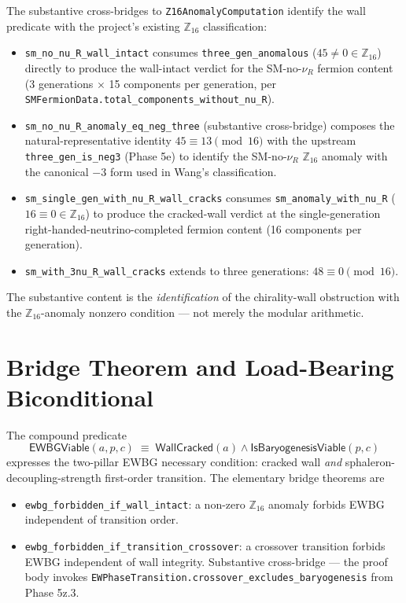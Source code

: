 \documentclass[aps,prl,twocolumn,showpacs,superscriptaddress,nofootinbib]{revtex4-2}
\newcommand{\WallCracked}{\mathsf{WallCracked}}
\newcommand{\EWBGViable}{\mathsf{EWBGViable}}
\newcommand{\Zsixteen}{\mathbb{Z}_{16}}
\begin{document}
The substantive cross-bridges to \texttt{Z16AnomalyComputation}
identify the wall predicate with the project's existing $\Zsixteen$
classification:
\begin{itemize}
\item \texttt{sm\_no\_nu\_R\_wall\_intact} consumes
\texttt{three\_gen\_anomalous} ($45 \ne 0 \in \Zsixteen$) directly
to produce the wall-intact verdict for the SM-no-$\nu_R$ fermion
content (3 generations $\times$ 15 components per generation, per
\texttt{SMFermionData.total\_components\_without\_nu\_R}).
\item \texttt{sm\_no\_nu\_R\_anomaly\_eq\_neg\_three} (substantive
cross-bridge) composes the natural-representative identity
$45 \equiv 13 \pmod{16}$ with the upstream
\texttt{three\_gen\_is\_neg3} (Phase 5e) to identify the SM-no-$\nu_R$
$\Zsixteen$ anomaly with the canonical $-3$ form used in Wang's
classification.
\item \texttt{sm\_single\_gen\_with\_nu\_R\_wall\_cracks} consumes
\texttt{sm\_anomaly\_with\_nu\_R} ($16 \equiv 0 \in \Zsixteen$) to
produce the cracked-wall verdict at the single-generation
right-handed-neutrino-completed fermion content (16 components per
generation).
\item \texttt{sm\_with\_3nu\_R\_wall\_cracks} extends to three
generations: $48 \equiv 0 \pmod{16}$.
\end{itemize}

The substantive content is the \emph{identification} of the
chirality-wall obstruction with the $\Zsixteen$-anomaly nonzero
condition --- not merely the modular arithmetic.

\section{Bridge Theorem and Load-Bearing Biconditional}
\label{sec:bridge}

The compound \EWBGViable{} predicate
\begin{equation}
\label{eq:viability}
\EWBGViable{}(a, p, c) \;\equiv\; \WallCracked{}(a) \wedge
\mathsf{IsBaryogenesisViable}(p, c)
\end{equation}
expresses the two-pillar EWBG necessary condition: cracked wall
\emph{and} sphaleron-decoupling-strength first-order transition. The
elementary bridge theorems are
\begin{itemize}
\item \texttt{ewbg\_forbidden\_if\_wall\_intact}: a non-zero
$\Zsixteen$ anomaly forbids EWBG independent of transition order.
\item \texttt{ewbg\_forbidden\_if\_transition\_crossover}: a crossover
transition forbids EWBG independent of wall integrity. Substantive
cross-bridge --- the proof body invokes
\texttt{EWPhaseTransition.crossover\_excludes\_baryogenesis} from
Phase 5z.3.
\end{itemize}
\end{document}
